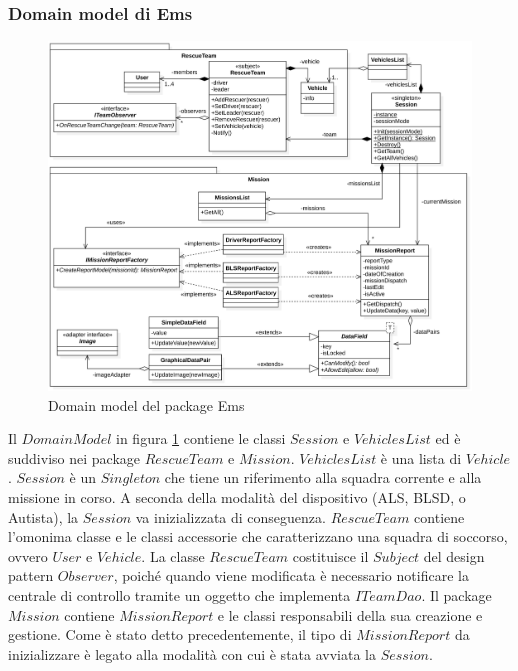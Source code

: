 \documentclass{article}
\begin{document}
    \subsubsection{Domain model di Ems}
    \begin{figure}[!h]
        \centering
        \includegraphics[width=5.4in]{diagrams/png/uml-ems-domain.png}
        \caption{Domain model del package Ems}
        \label{fig:uml-ems-domainmodel}
    \end{figure}
    Il $DomainModel$ in figura \ref{fig:uml-ems-domainmodel} contiene le classi $Session$ e $VehiclesList$ ed è suddiviso nei package $RescueTeam$ e $Mission$.
    $VehiclesList$ è una lista di $Vehicle$. $Session$ è un $Singleton$ che tiene un riferimento alla squadra corrente e alla missione in corso.
    A seconda della modalità del dispositivo (ALS, BLSD, o Autista), la $Session$ va inizializzata di conseguenza.
    $RescueTeam$ contiene l'omonima classe e le classi accessorie che caratterizzano una squadra di soccorso, ovvero $User$ e $Vehicle$.
    La classe $RescueTeam$ costituisce il $Subject$ del design pattern $Observer$, poiché quando viene modificata è necessario notificare la centrale di controllo tramite un oggetto che implementa $ITeamDao$.
    \newline Il package $Mission$ contiene $MissionReport$ e le classi responsabili della sua creazione e gestione.
    \newline Come è stato detto precedentemente, il tipo di $MissionReport$ da inizializzare è legato alla modalità con cui è stata avviata la $Session$.
\end{document}
